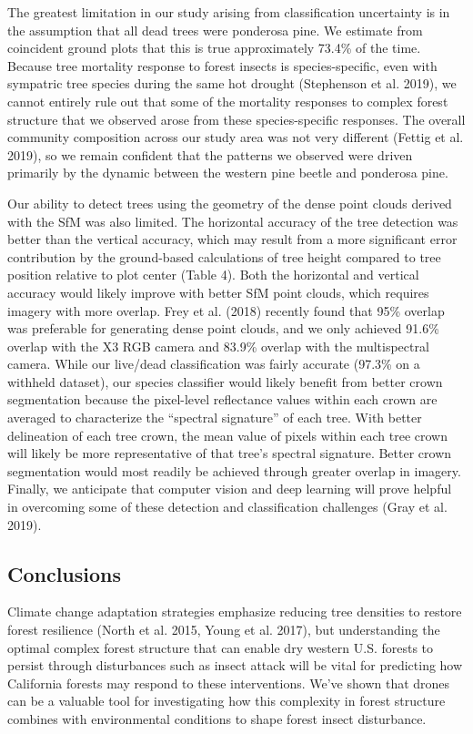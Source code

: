 \documentclass[]{article}
\begin{document}
The greatest limitation in our study arising from classification
uncertainty is in the assumption that all dead trees were ponderosa
pine. We estimate from coincident ground plots that this is true
approximately 73.4\% of the time. Because tree mortality response to
forest insects is species-specific, even with sympatric tree species
during the same hot drought (Stephenson et al. 2019), we cannot entirely
rule out that some of the mortality responses to complex forest
structure that we observed arose from these species-specific responses.
The overall community composition across our study area was not very
different (Fettig et al. 2019), so we remain confident that the patterns
we observed were driven primarily by the dynamic between the western
pine beetle and ponderosa pine.

Our ability to detect trees using the geometry of the dense point clouds
derived with the SfM was also limited. The horizontal accuracy of the
tree detection was better than the vertical accuracy, which may result
from a more significant error contribution by the ground-based
calculations of tree height compared to tree position relative to plot
center (Table 4). Both the horizontal and vertical accuracy would likely
improve with better SfM point clouds, which requires imagery with more
overlap. Frey et al. (2018) recently found that 95\% overlap was
preferable for generating dense point clouds, and we only achieved
91.6\% overlap with the X3 RGB camera and 83.9\% overlap with the
multispectral camera. While our live/dead classification was fairly
accurate (97.3\% on a withheld dataset), our species classifier would
likely benefit from better crown segmentation because the pixel-level
reflectance values within each crown are averaged to characterize the
``spectral signature'' of each tree. With better delineation of each
tree crown, the mean value of pixels within each tree crown will likely
be more representative of that tree's spectral signature. Better crown
segmentation would most readily be achieved through greater overlap in
imagery. Finally, we anticipate that computer vision and deep learning
will prove helpful in overcoming some of these detection and
classification challenges (Gray et al. 2019).

\subsection{Conclusions}\label{conclusions}

Climate change adaptation strategies emphasize reducing tree densities
to restore forest resilience (North et al. 2015, Young et al. 2017), but
understanding the optimal complex forest structure that can enable dry
western U.S. forests to persist through disturbances such as insect
attack will be vital for predicting how California forests may respond
to these interventions. We've shown that drones can be a valuable tool
for investigating how this complexity in forest structure combines with
environmental conditions to shape forest insect disturbance.
\end{document}
